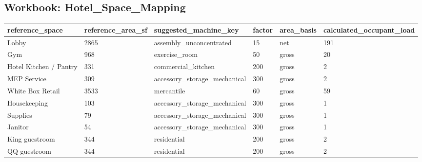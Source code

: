 \documentclass[10pt]{article}
\begin{document}
\subsection{Workbook: Hotel\_Space\_Mapping}
\begin{longtable}{p{3cm}p{3cm}p{3cm}p{3cm}p{3cm}p{3cm}}
\toprule
reference\_space & reference\_area\_sf & suggested\_machine\_key & factor & area\_basis & calculated\_occupant\_load \\ \midrule \endhead
Lobby & 2865 & assembly\_unconcentrated & 15 & net & 191 \\
Gym & 968 & exercise\_room & 50 & gross & 20 \\
Hotel Kitchen / Pantry & 331 & commercial\_kitchen & 200 & gross & 2 \\
MEP Service & 309 & accessory\_storage\_mechanical & 300 & gross & 2 \\
White Box Retail & 3533 & mercantile & 60 & gross & 59 \\
Housekeeping & 103 & accessory\_storage\_mechanical & 300 & gross & 1 \\
Supplies & 79 & accessory\_storage\_mechanical & 300 & gross & 1 \\
Janitor & 54 & accessory\_storage\_mechanical & 300 & gross & 1 \\
King guestroom & 344 & residential & 200 & gross & 2 \\
QQ guestroom & 344 & residential & 200 & gross & 2 \\
\bottomrule\end{longtable}
\end{document}
